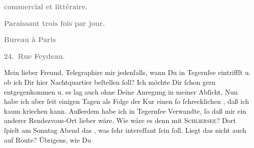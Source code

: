 \begin{ledgroupsized}[t]{13cm}
           \begin{otherlanguage}{french}\textcolor{gray}{\textbf{commercial et littéraire.}}\end{otherlanguage}\pend
           \pstart
           \begin{otherlanguage}{french}\textcolor{gray}{\textbf{\textbf{Paraissant trois fois par jour.}}}\end{otherlanguage}\pend
           \pstart
           \begin{otherlanguage}{french}\textcolor{gray}{\textbf{\textbf{Bureau à Paris}}}\end{otherlanguage}\pend
           \pstart
           \begin{otherlanguage}{french}\textcolor{gray}{\textbf{\textbf{24. Rue Feydeau.}}}\end{otherlanguage}\pend
           \pstart\center{}Mein lieber Freund,\pend\pstart
           Telegraphire mir jedenſalls, \strikeout{\textcolor{gray}{ob}} wann Du in Tegernſee eintriffſt u. ob
               ich Dir hier Nachtquartier beſtellen ſoll? Ich möchte Dir ſchon gern entgegenkommen
               u. es lag auch ohne Deine Anregung in meiner Abſicht. Nun habe ich aber ſeit einigen
               Tagen als Folge der Kur einen ſo ſchrecklichen \label{K_L02746-1v}\label{K_L02746-1h}, daß ich kaum kriechen kann. Außerdem habe
               ich in Tegernſee Verwandte, ſo daß mir ein
               anderer Rendezvous-Ort lieber wäre. Wie wäre es denn mit \textsc{Schliersee}? Dort {\pb}ſpielt am Sonntag{ }Abend das \label{K_L02746-2v}\label{K_L02746-2h}, was ſehr intereſſant ſein ſoll. Liegt das nicht auch auf \label{K_L02746-3v}\label{K_L02746-3h} Route? Übrigens, wie Du

\end{ledgroupsized}
